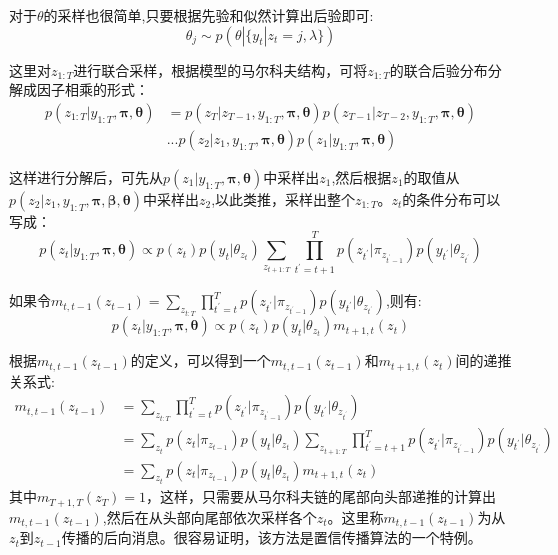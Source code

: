 对于${\theta}$的采样也很简单,只要根据先验和似然计算出后验即可:
\begin{equation}
\theta_j \sim p(\theta|\{y_t|z_t = j,\lambda\})
\end{equation}

这里对$z_{1:T}$进行联合采样，根据模型的马尔科夫结构，可将$z_{1:T}$的联合后验分布分解成因子相乘的形式：
\begin{equation}
\begin{aligned}
p(z_{1:T}|y_{1:T},{\bm \pi},{\bm \theta}) &=  p(z_T|z_{T-1},y_{1:T},{\bm \pi},{\bm \theta})p(z_{T-1}|z_{T-2},y_{1:T},{\bm \pi},{\bm \theta})\\
											&...p(z_2|z_{1},y_{1:T},{\bm \pi},{\bm \theta})p(z_1|y_{1:T},{\bm \pi},{\bm \theta})
\end{aligned}
\end{equation}

这样进行分解后，可先从$p(z_1|y_{1:T},{\bm \pi},{\bm \theta})$中采样出$z_1$,然后根据$z_1$的取值从$p(z_2|z_1,y_{1:T},{\bm \pi},{\bm \beta},{\bm \theta})$中采样出$z_2$,以此类推，采样出整个$z_{1:T}$。$z_t$的条件分布可以写成：
\begin{equation}
p(z_t|y_{1:T},{\bm \pi},{\bm \theta}) \propto p(z_t)p(y_t|\theta_{z_t})\sum_{z_{t+1:T}}{\prod_{t^\prime = t+1}^{T}{p(z_{t^\prime}|\pi_{z_{t^\prime-1}})p(y_{t^\prime}|\theta_{z_{t^\prime }})}}
\end{equation}

如果令$m_{t,t-1}(z_{t-1}) = \sum_{z_{t:T}}{\prod_{t^\prime = t}^{T}{p(z_{t^\prime}|\pi_{z_{t^\prime-1}})p(y_{t^\prime}|\theta_{z_{t^\prime }})}}$,则有:
\begin{equation}
p(z_t|y_{1:T},{\bm \pi},{\bm \theta}) \propto p(z_t)p(y_t|\theta_{z_t})m_{t+1,t}(z_{t})
\end{equation}

根据$m_{t,t-1}(z_{t-1})$的定义，可以得到一个$m_{t,t-1}(z_{t-1})$和$m_{t+1,t}(z_{t})$间的递推关系式:
\begin{equation}
\begin{aligned}
m_{t,t-1}(z_{t-1}) &= \sum_{z_{t:T}}{\prod_{t^\prime = t}^{T}{p(z_{t^\prime}|\pi_{z_{t^\prime-1}})p(y_{t^\prime}|\theta_{z_{t^\prime }})}} \\
   					& = \sum_{z_{t}}{p(z_{t}|\pi_{z_{t-1}})p(y_{t}|\theta_{z_{t}})  \sum_{z_{t+1:T}}{\prod_{t^\prime = t+1}^{T}{p(z_{t^\prime}|\pi_{z_{t^\prime-1}})p(y_{t^\prime}|\theta_{z_{t^\prime }})}}} \\
   					& = \sum_{z_{t}}{p(z_{t}|\pi_{z_{t-1}})p(y_{t}|\theta_{z_{t}}) m_{t+1,t}(z_{t}) }
\end{aligned}
\end{equation}
其中$m_{T+1,T}(z_{T}) = 1$，这样，只需要从马尔科夫链的尾部向头部递推的计算出$m_{t,t-1}(z_{t-1})$,然后在从头部向尾部依次采样各个$z_t$。这里称$m_{t,t-1}(z_{t-1})$为从$z_t$到$z_{t-1}$传播的后向消息。很容易证明，该方法是置信传播算法的一个特例。

